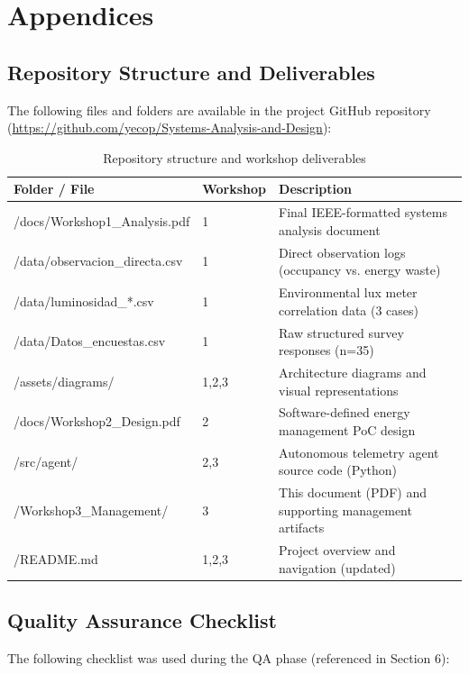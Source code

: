 \documentclass[12pt,a4paper]{article}
\begin{document}
\section{Appendices}

\subsection{Repository Structure and Deliverables}
The following files and folders are available in the project GitHub repository (\url{https://github.com/yecop/Systems-Analysis-and-Design}):

\begin{table}[H]
\caption{Repository structure and workshop deliverables}
\centering
\begin{tabular}{|p{3.5cm}|p{3cm}|p{6.5cm}|}
\hline
\textbf{Folder / File} & \textbf{Workshop} & \textbf{Description} \\
\hline
/docs/Workshop1\_Analysis.pdf & 1 & Final IEEE-formatted systems analysis document \\
\hline
/data/observacion\_directa.csv & 1 & Direct observation logs (occupancy vs. energy waste) \\
\hline
/data/luminosidad\_*.csv & 1 & Environmental lux meter correlation data (3 cases) \\
\hline
/data/Datos\_encuestas.csv & 1 & Raw structured survey responses (n=35) \\
\hline
/assets/diagrams/ & 1,2,3 & Architecture diagrams and visual representations \\
\hline
/docs/Workshop2\_Design.pdf & 2 & Software-defined energy management PoC design \\
\hline
/src/agent/ & 2,3 & Autonomous telemetry agent source code (Python) \\
\hline
/Workshop3\_Management/ & 3 & This document (PDF) and supporting management artifacts \\
\hline
/README.md & 1,2,3 & Project overview and navigation (updated) \\
\hline
\end{tabular}
\label{tab:repository}
\end{table}

\subsection{Quality Assurance Checklist}
The following checklist was used during the QA phase (referenced in Section 6):
\end{document}
